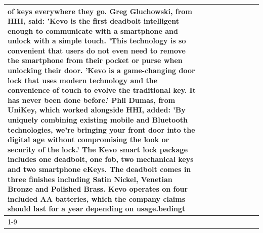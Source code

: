 \begin{table}[H]
\begin{tabular}{lllrlllll}
of keys everywhere they go. Greg Gluchowski, from HHI, said: 'Kevo is the first deadbolt intelligent enough to communicate with a smartphone and unlock with a simple touch. 'This technology is so convenient that users do not even need to remove the smartphone from their pocket or purse when unlocking their door. 'Kevo is a game-changing door lock that uses modern technology and the convenience of touch to evolve the traditional key. It has never been done before.' Phil Dumas, from UniKey, which worked alongside HHI, added: 'By uniquely combining existing mobile and Bluetooth technologies, we’re bringing your front door into the digital age without compromising the look or security of the lock.' The Kevo smart lock package includes one deadbolt, one fob, two mechanical keys and two smartphone eKeys. The deadbolt comes in three finishes including Satin Nickel, Venetian Bronze and Polished Brass. Kevo operates on four included AA batteries, which the company claims should last for a year depending on usage.bedingt \\
\cline{1-9}

\end{tabular}
\end{table}
